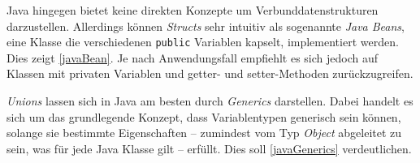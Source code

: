 Java hingegen bietet keine direkten Konzepte um Verbunddatenstrukturen darzustellen. Allerdings können \textit{Structs} sehr intuitiv als sogenannte \textit{Java Beans}, eine Klasse die verschiedenen \texttt{public} Variablen kapselt, implementiert werden. Dies zeigt \autoref{javaBean}. Je nach Anwendungsfall empfiehlt es sich jedoch auf Klassen mit privaten Variablen und getter- und setter-Methoden zurückzugreifen.


\textit{Unions} lassen sich in Java am besten durch \textit{Generics} darstellen. Dabei handelt es sich um das grundlegende Konzept, dass Variablentypen generisch sein können, solange sie bestimmte Eigenschaften -- zumindest vom Typ \textit{Object} abgeleitet zu sein, was für jede Java Klasse gilt -- erfüllt. Dies soll \autoref{javaGenerics} verdeutlichen.

